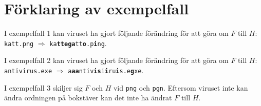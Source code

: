 \section*{Förklaring av exempelfall}
I exempelfall 1 kan viruset ha gjort följande förändring för att göra om $F$ till $H$:
\texttt{katt.png} $\Rightarrow$ \texttt{ka\textbf{ttega}tt\textbf{o}.p\textbf{i}ng}.


I exempelfall 2 kan viruset ha gjort följande förändring för att göra om $F$ till $H$:
\texttt{antivirus.exe} $\Rightarrow$ \texttt{a\textbf{aa}ntiv\textbf{is}i\textbf{i}ru\textbf{i}s.e\textbf{g}xe}.


I exempelfall 3 skiljer sig $F$ och $H$ vid \texttt{png} och \texttt{pgn}. Eftersom viruset inte kan ändra ordningen på bokstäver
kan det inte ha ändrat $F$ till $H$. 
